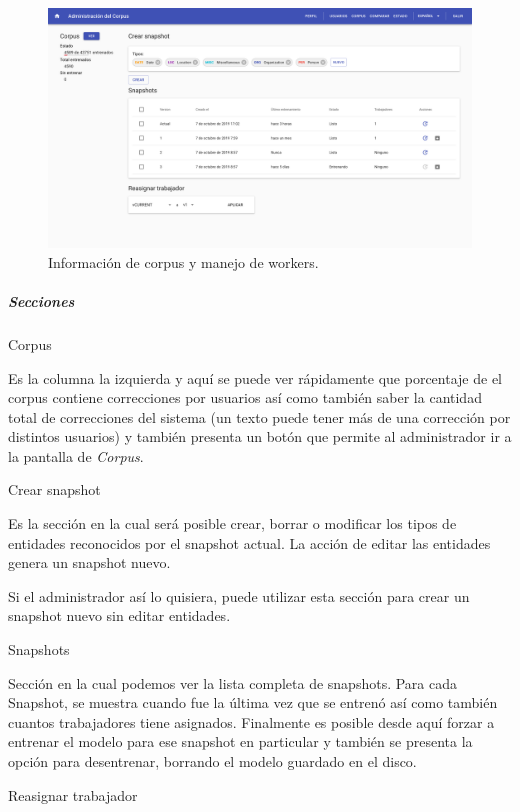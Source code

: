 \documentclass[12pt,a4paper,]{scrartcl}
\let\oldsubparagraph\subparagraph
\renewcommand{\subparagraph}[1]{\oldsubparagraph{#1}\mbox{}}
\begin{document}
\begin{figure}[H]

{\centering \includegraphics{assets/logic/status.pdf} 

}

\caption{Información de corpus y manejo de workers.}\label{fig:logic-status}
\end{figure}

\hypertarget{secciones}{%
\subparagraph{Secciones}\label{secciones}}

Corpus

Es la columna la izquierda y aquí se puede ver rápidamente que porcentaje de el corpus contiene correcciones por usuarios así como también saber la cantidad total de correcciones del sistema (un texto puede tener más de una corrección por distintos usuarios) y también presenta un botón que permite al administrador ir a la pantalla de \emph{Corpus}.

Crear snapshot

Es la sección en la cual será posible crear, borrar o modificar los tipos de entidades reconocidos por el snapshot actual. La acción de editar las entidades genera un snapshot nuevo.

Si el administrador así lo quisiera, puede utilizar esta sección para crear un snapshot nuevo sin editar entidades.

Snapshots

Sección en la cual podemos ver la lista completa de snapshots.
Para cada Snapshot, se muestra cuando fue la última vez que se entrenó así como también cuantos trabajadores tiene asignados. Finalmente es posible desde aquí forzar a entrenar el modelo para ese snapshot en particular y también se presenta la opción para desentrenar, borrando el modelo guardado en el disco.

Reasignar trabajador
\end{document}
